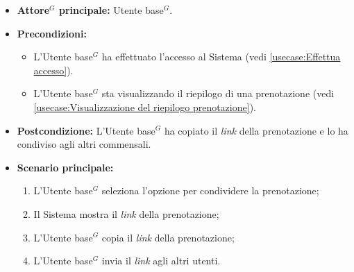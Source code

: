 \label{usecase:Condivisione della prenotazione}
\begin{itemize}
	\item \textbf{\gls{Attore}$^G$ principale:} \gls{Utente base}$^G$.

	\item \textbf{Precondizioni:}
	\begin{itemize}
		\item L'\gls{Utente base}$^G$ ha effettuato l'accesso al Sistema (vedi \autoref{usecase:Effettua accesso}).
		\item L'\gls{Utente base}$^G$ sta visualizzando il riepilogo di una prenotazione (vedi \autoref{usecase:Visualizzazione del riepilogo prenotazione}).
	\end{itemize}

	\item \textbf{Postcondizione:}
	      L'\gls{Utente base}$^G$ ha copiato il \textit{link} della prenotazione e lo ha condiviso agli altri commensali.

	\item \textbf{Scenario principale:}
	      \begin{enumerate}
		      \item L'\gls{Utente base}$^G$ seleziona l'opzione per condividere la prenotazione;
		      \item Il Sistema mostra il \textit{link} della prenotazione;
		      \item L'\gls{Utente base}$^G$ copia il \textit{link} della prenotazione;
		      \item L'\gls{Utente base}$^G$ invia il \textit{link} agli altri utenti.
	      \end{enumerate}
\end{itemize}
